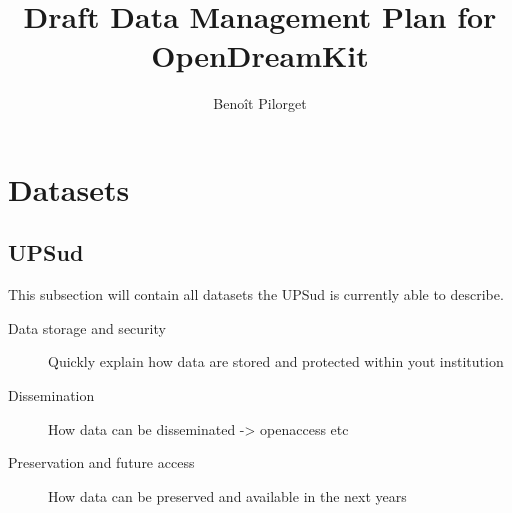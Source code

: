 \documentclass[12pt]{amsbook}
\title{Draft Data Management Plan for OpenDreamKit}
\author{Benoît Pilorget}
\begin{document}
\maketitle

\section{Datasets}



\subsection{UPSud}

This subsection will contain all datasets the UPSud is currently able to describe.
\begin{description}
\item[Data storage and security] Quickly explain how data are stored and protected within yout institution
\item[Dissemination] How data can be disseminated -> openaccess etc
\item[Preservation and future access] How data can be preserved and available in the next years
\end{description}
\end{document}
